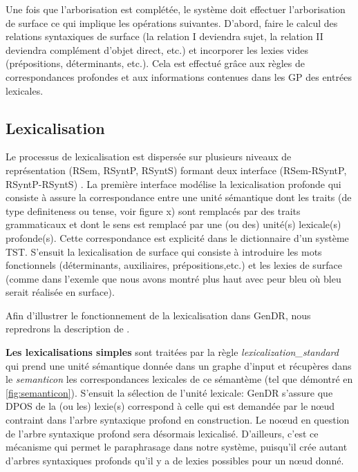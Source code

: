 Une fois que l'arborisation est complétée, le système doit effectuer l'arborisation de surface ce qui implique les opérations suivantes. D'abord, faire le calcul des relations syntaxiques de surface (la relation I deviendra sujet, la relation II deviendra complément d'objet direct, etc.) et incorporer les lexies vides (prépositions, déterminants, etc.). Cela est effectué grâce aux règles de correspondances profondes et aux informations contenues dans les \ac{GP} des entrées lexicales.

\subsection{Lexicalisation}

Le processus de lexicalisation est dispersée sur plusieurs niveaux de représentation (\ac{RSem}, \ac{RSyntP}, \ac{RSyntS}) formant deux interface (\ac{RSem}-\ac{RSyntP}, \ac{RSyntP}-\ac{RSyntS}) \citep{PolguerePourmodelestratifie}. La première interface modélise la lexicalisation profonde qui consiste à assure la correspondance entre une unité sémantique dont les traits (de type definiteness ou tense, voir figure x) sont remplacés par des traits grammaticaux et dont le sens est remplacé par une (ou des) unité(s) lexicale(s) profonde(s). Cette correspondance est explicité dans le dictionnaire d'un système \ac{TST}. S'ensuit la lexicalisation de surface qui consiste à introduire les mots fonctionnels (déterminants, auxiliaires, prépositions,etc.) et les lexies de surface (comme dans l'exemle que nous avons montré plus haut avec peur bleu où bleu serait réalisée en surface). 

Afin d'illustrer le fonctionnement de la lexicalisation dans GenDR, nous repredrons la description de \cite{lareau18}.

\textbf{Les lexicalisations simples}
sont traitées par la règle \emph{lexicalization\_standard} qui prend une unité sémantique donnée dans un graphe d'input et récupères dans le \emph{semanticon} les correspondances lexicales de ce sémantème (tel que démontré en \ref{fig:semanticon}). S'ensuit la sélection de l'unité lexicale: GenDR s'assure que \ac{DPOS} de la (ou les) lexie(s) correspond à celle qui est demandée par le n\oe{}ud contraint dans l'arbre syntaxique profond en construction. Le no\oe{}ud en question de l'arbre syntaxique profond sera désormais lexicalisé. D'ailleurs, c'est ce mécanisme qui permet le paraphrasage dans notre système, puisqu'il crée autant d'arbres syntaxiques profonds qu'il y a de lexies possibles pour un n\oe{}ud donné.

